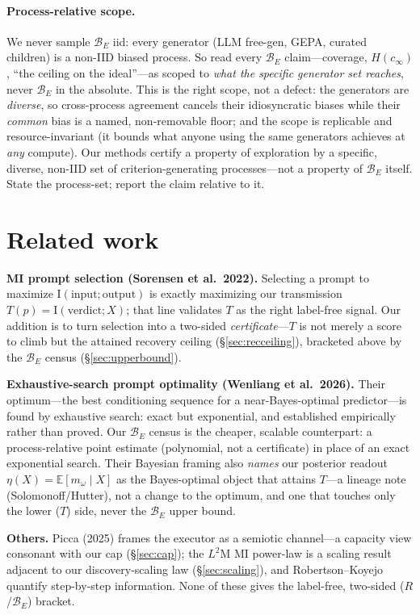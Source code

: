 \documentclass[11pt]{article}
\newcommand{\Iv}{\mathrm{I}}
\newcommand{\Bset}{\mathcal{B}_E}
\newcommand{\Mw}{m_\omega}
\newcommand{\cinf}{c_\infty}
\begin{document}
\paragraph{Process-relative scope.} We never sample $\Bset$ iid: every generator (LLM free-gen, GEPA,
curated children) is a non-IID biased process. So read every $\Bset$ claim---coverage, $H(\cinf)$, ``the
ceiling on the ideal''---as scoped to \emph{what the specific generator set reaches}, never $\Bset$ in the
absolute. This is the right scope, not a defect: the generators are \emph{diverse}, so cross-process
agreement cancels their idiosyncratic biases while their \emph{common} bias is a named, non-removable floor;
and the scope is replicable and resource-invariant (it bounds what anyone using the same generators achieves
at \emph{any} compute). Our methods certify a property of exploration by a specific, diverse, non-IID set of
criterion-generating processes---not a property of $\Bset$ itself. State the process-set; report the claim
relative to it.

\section{Related work}\label{sec:related}
\textbf{MI prompt selection (Sorensen et al.\ 2022).} Selecting a prompt to maximize
$\Iv(\text{input};\text{output})$ is exactly maximizing our transmission $T(p)=\Iv(\text{verdict};X)$; that
line validates $T$ as the right label-free signal. Our addition is to turn selection into a two-sided
\emph{certificate}---$T$ is not merely a score to climb but the attained recovery ceiling
(\S\ref{sec:recceiling}), bracketed above by the $\Bset$ census (\S\ref{sec:upperbound}).

\textbf{Exhaustive-search prompt optimality (Wenliang et al.\ 2026).} Their optimum---the best conditioning
sequence for a near-Bayes-optimal predictor---is found by exhaustive search: exact but exponential, and
established empirically rather than proved. Our $\Bset$ census is the cheaper, scalable counterpart: a
process-relative point estimate (polynomial, not a certificate) in place of an exact exponential search.
Their Bayesian framing also \emph{names} our posterior readout $\eta(X)=\mathbb E[\Mw\mid X]$ as the
Bayes-optimal object that attains $T$---a lineage note (Solomonoff/Hutter), not a change to the optimum, and
one that touches only the lower ($T$) side, never the $\Bset$ upper bound.

\textbf{Others.} Picca (2025) frames the executor as a semiotic channel---a capacity view consonant with our
cap (\S\ref{sec:cap}); the $L^2$M MI power-law is a scaling result adjacent to our discovery-scaling law
(\S\ref{sec:scaling}), and Robertson--Koyejo quantify step-by-step information. None of these gives the
label-free, two-sided ($R$/$\Bset$) bracket.
\end{document}

